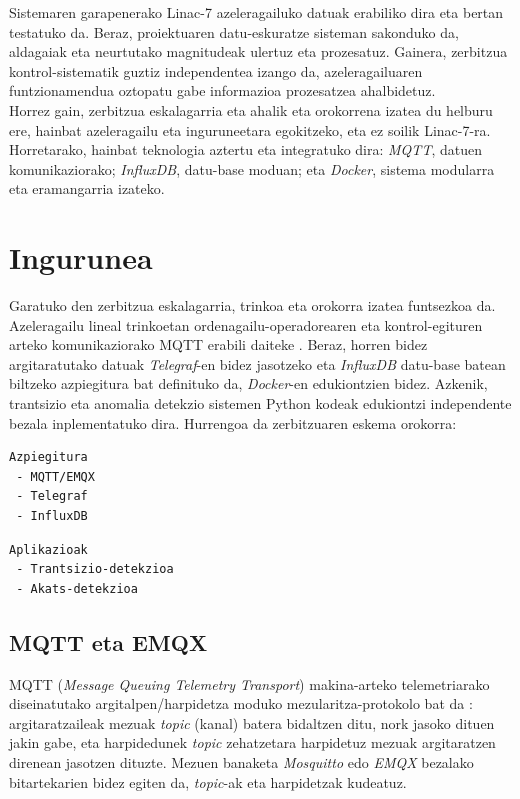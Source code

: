\documentclass[12pt]{article}
\numberwithin{figure}{section}
\numberwithin{equation}{section}
\begin{document}
Sistemaren garapenerako Linac-7 azeleragailuko datuak erabiliko dira eta bertan testatuko da. Beraz, proiektuaren datu-eskuratze sisteman sakonduko da, aldagaiak eta neurtutako magnitudeak ulertuz eta prozesatuz. Gainera, zerbitzua kontrol-sistematik guztiz independentea izango da, azeleragailuaren funtzionamendua oztopatu gabe informazioa prozesatzea ahalbidetuz.\\

Horrez gain, zerbitzua eskalagarria eta ahalik eta orokorrena izatea du helburu ere, hainbat azeleragailu eta inguruneetara egokitzeko, eta ez soilik Linac-7-ra. Horretarako, hainbat teknologia aztertu eta integratuko dira: \textit{MQTT}, datuen komunikaziorako; \textit{InfluxDB}, datu-base moduan; eta \textit{Docker}, sistema modularra eta eramangarria izateko.


\newpage
\section{Ingurunea}
\label{sec:ingurunea}
Garatuko den zerbitzua eskalagarria, trinkoa eta orokorra izatea funtsezkoa da. Azeleragailu lineal trinkoetan ordenagailu-operadorearen eta kontrol-egituren arteko komunikaziorako MQTT erabili daiteke \cite{rafique_recent_2024}\cite{fukui_design_2019}. Beraz, horren bidez argitaratutako datuak \textit{Telegraf}-en bidez jasotzeko eta \textit{InfluxDB} datu-base batean biltzeko azpiegitura bat definituko da, \textit{Docker}-en edukiontzien bidez. Azkenik, trantsizio eta anomalia detekzio sistemen Python kodeak edukiontzi independente bezala inplementatuko dira. Hurrengoa da zerbitzuaren eskema orokorra:

\begin{multicols}{2}
\begin{verbatim}
Azpiegitura
 - MQTT/EMQX
 - Telegraf
 - InfluxDB
\end{verbatim}

\columnbreak

\begin{verbatim}
Aplikazioak
 - Trantsizio-detekzioa
 - Akats-detekzioa
\end{verbatim}
\end{multicols}

\subsection{MQTT eta EMQX}
MQTT (\textit{Message Queuing Telemetry Transport}) makina-arteko telemetriarako diseinatutako argitalpen/harpidetza moduko mezularitza-protokolo bat da \cite{noauthor_beginners_2016}: argitaratzaileak mezuak \textit{topic} (kanal) batera bidaltzen ditu, nork jasoko dituen jakin gabe, eta harpidedunek \textit{topic} zehatzetara harpidetuz mezuak argitaratzen direnean jasotzen dituzte. Mezuen banaketa \textit{Mosquitto} edo \textit{EMQX} bezalako bitartekarien bidez egiten da, \textit{topic}-ak eta harpidetzak kudeatuz.\\
\end{document}
